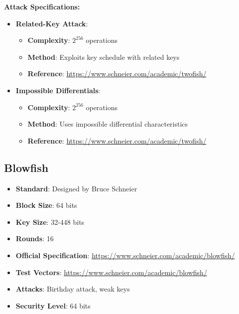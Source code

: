 \documentclass[11pt,a4paper]{article}
\begin{document}
\textbf{Attack Specifications:}
\begin{itemize}
    \item \textbf{Related-Key Attack}: 
    \begin{itemize}
        \item \textbf{Complexity}: $2^{256}$ operations
        \item \textbf{Method}: Exploits key schedule with related keys
        \item \textbf{Reference}: \url{https://www.schneier.com/academic/twofish/}
    \end{itemize}
    \item \textbf{Impossible Differentials}: 
    \begin{itemize}
        \item \textbf{Complexity}: $2^{256}$ operations
        \item \textbf{Method}: Uses impossible differential characteristics
        \item \textbf{Reference}: \url{https://www.schneier.com/academic/twofish/}
    \end{itemize}
\end{itemize}

\subsection{Blowfish}
\begin{itemize}
    \item \textbf{Standard}: Designed by Bruce Schneier
    \item \textbf{Block Size}: 64 bits
    \item \textbf{Key Size}: 32-448 bits
    \item \textbf{Rounds}: 16
    \item \textbf{Official Specification}: \url{https://www.schneier.com/academic/blowfish/}
    \item \textbf{Test Vectors}: \url{https://www.schneier.com/academic/blowfish/}
    \item \textbf{Attacks}: Birthday attack, weak keys
    \item \textbf{Security Level}: 64 bits
\end{itemize}
\end{document}
